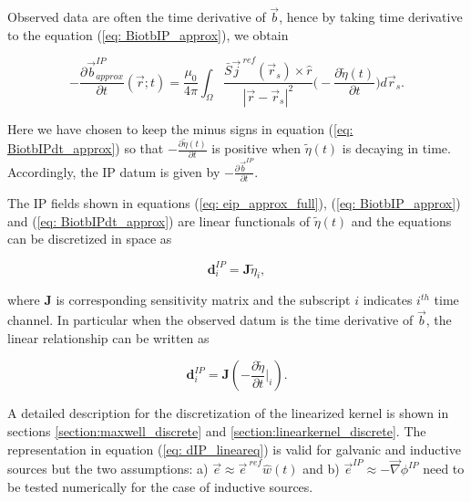 \documentclass[extra,mreferee]{gji}
\newcommand{\grad}{\vec \nabla}
\renewcommand {\j}  { {\vec j} }
\renewcommand {\b}  { {\vec b} }
\newcommand {\e}  { {\vec e} }
\newcommand{\peta}{\tilde{\eta}}
\newcommand{\eref}{\e^{\ ref}}
\newcommand{\jref}{\j^{\ ref}}
\begin{document}
Observed data are often the time derivative of $\b$, hence by taking time derivative to the equation (\ref{eq: BiotbIP_approx}), we obtain
\begin{linenomath*}
\begin{equation}
  -\frac{\partial\b^{IP}_{approx}}{\partial t}(\vec{r}; t) = \frac{\mu_0}{4\pi} \int_{\Omega}  \frac{\bar{S}\jref(\vec{r}_s)\times\hat{r}}{|\vec{r}-\vec{r}_s|^2} \Big( -\frac{\partial \peta(t)}{\partial t} \Big) d\vec{r}_s.
  \label{eq: BiotbIPdt_approx}
\end{equation}
\end{linenomath*}
Here we have chosen to keep the minus signs in equation (\ref{eq: BiotbIPdt_approx}) so that $-\frac{\partial \peta(t)}{\partial t}$ is positive when $\peta(t)$ is decaying in time. 
Accordingly, the IP datum is given by  $-\frac{\partial\b^{IP}}{\partial t}$. 

The IP fields shown in equations (\ref{eq: eip_approx_full}), (\ref{eq: BiotbIP_approx}) and (\ref{eq: BiotbIPdt_approx}) are linear functionals of $\peta(t)$ and  the equations can be discretized in space as
\begin{linenomath*}
\begin{equation}
  \mathbf{d}^{IP}_i = \mathbf{J}\peta_i,
  \label{eq: dIP_lineareq}
\end{equation}
\end{linenomath*}
where $\mathbf{J}$ is corresponding sensitivity matrix and the subscript $i$ indicates $i^{th}$ time channel. 
In particular when the observed datum is the time derivative of $\b$, the linear relationship can be written as 
\begin{linenomath*}
\begin{equation}
  \mathbf{d}^{IP}_i = \mathbf{J}(-\frac{\partial \peta}{\partial t}\Big|_i).
  \label{eq: dIP_lineareq_dbdt}
\end{equation}
\end{linenomath*}
A detailed description for the discretization of the linearized kernel is shown in sections \ref{section:maxwell_discrete} and \ref{section:linearkernel_discrete}. 
The representation in equation (\ref{eq: dIP_lineareq}) is valid for galvanic and inductive sources but the two assumptions: a) $\e \approx \eref \hat{w}(t)$ and b) $\e^{IP} \approx -\grad\phi^{IP}$ need to be tested numerically for the case of inductive sources. 

\end{document}

